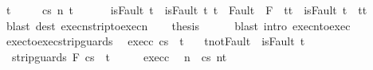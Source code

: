 \begin{isabellebody}
\ t{\isacharprime}\ \isanewline
\ \ \ \ {\isachardoublequoteopen}{\isasymGamma}{\isasymturnstile}{\isasymlangle}c{\isacharcomma}s{\isasymrangle}\ {\isacharequal}n{\isasymRightarrow}\ t{\isacharprime}{\isachardoublequoteclose}\ \ \isanewline
\ \ \ \ {\isachardoublequoteopen}isFault\ t\ {\isasymlongrightarrow}\ isFault\ t{\isacharprime}{\isachardoublequoteclose}\ {\isachardoublequoteopen}t{\isacharprime}\ {\isasymin}\ Fault\ {\isacharbackquote}\ {\isacharparenleft}{\isacharminus}F{\isacharparenright}\ {\isasymlongrightarrow}\ t{\isacharprime}{\isacharequal}t{\isachardoublequoteclose}\ {\isachardoublequoteopen}{\isasymnot}\ isFault\ t{\isacharprime}\ {\isasymlongrightarrow}\ t{\isacharprime}{\isacharequal}t{\isachardoublequoteclose}\isanewline
\ \ \ \ \isamarkupfalse%
\ {\isacharparenleft}blast\ dest{\isacharcolon}\ execn{\isacharunderscore}strip{\isacharunderscore}to{\isacharunderscore}execn{\isacharparenright}\isanewline
\ \ \isamarkupfalse%
\ {\isacharquery}thesis\isanewline
\ \ \ \ \isamarkupfalse%
\ {\isacharparenleft}blast\ intro{\isacharcolon}\ execn{\isacharunderscore}to{\isacharunderscore}exec{\isacharparenright}\isanewline
{}\isamarkupfalse%
%
\endisatagproof
{\isafoldproof}%
%
\isadelimproof
\isanewline
%
\endisadelimproof
\isanewline
\isanewline
{}\isamarkupfalse%
\ exec{\isacharunderscore}to{\isacharunderscore}exec{\isacharunderscore}strip{\isacharunderscore}guards{\isacharcolon}\isanewline
\ \ exec{\isacharunderscore}c{\isacharcolon}\ {\isachardoublequoteopen}{\isasymGamma}{\isasymturnstile}{\isasymlangle}c{\isacharcomma}s{\isasymrangle}\ {\isasymRightarrow}\ t{\isachardoublequoteclose}\ \isanewline
\ \ t{\isacharunderscore}not{\isacharunderscore}Fault{\isacharcolon}\ {\isachardoublequoteopen}{\isasymnot}\ isFault\ t{\isachardoublequoteclose}\isanewline
\ \ {\isachardoublequoteopen}{\isasymGamma}{\isasymturnstile}{\isasymlangle}strip{\isacharunderscore}guards\ F\ c{\isacharcomma}s{\isasymrangle}\ {\isasymRightarrow}\ t{\isachardoublequoteclose}\isanewline
%
\isadelimproof
%
\endisadelimproof
%
\isatagproof
{}\isamarkupfalse%
\ {\isacharminus}\isanewline
\ \ \isamarkupfalse%
\ exec{\isacharunderscore}c\ \isamarkupfalse%
\ n\ \ {\isachardoublequoteopen}{\isasymGamma}{\isasymturnstile}{\isasymlangle}c{\isacharcomma}s{\isasymrangle}\ {\isacharequal}n{\isasymRightarrow}t{\isachardoublequoteclose}\ \isanewline
\ \ \ \ \isamarkupfalse%

\end{isabellebody}
